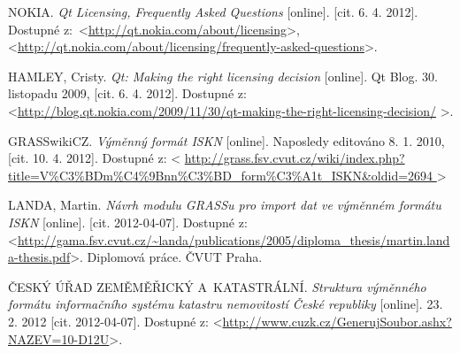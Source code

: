 \documentclass[a4paper,12pt]{article}
\begin{document}
\newpage
\renewcommand{\refname}{Literatura}
{}
\begin{thebibliography}{9}

NOKIA. \textit{Qt Licensing, Frequently Asked Questions} [online]. [cit. 6. 4. 2012].
Dostupné z:~\textless\url{http://qt.nokia.com/about/licensing}\textgreater, \textless\url{http://qt.nokia.com/about/licensing/frequently-asked-questions}\textgreater.

HAMLEY, Cristy. \textit{Qt: Making the right licensing decision} [online]. Qt Blog. 30. listopadu 2009, [cit. 6. 4. 2012]. Dostupné z: \textless\url{http://blog.qt.nokia.com/2009/11/30/qt-making-the-right-licensing-decision/} \textgreater.

GRASSwikiCZ. \textit{Výměnný formát ISKN} [online].
Naposledy editováno 8. 1. 2010, [cit. 10. 4. 2012]. Dostupné z: \textless
\url{
    http://grass.fsv.cvut.cz/wiki/index.php?title=V%
    } \textgreater

LANDA, Martin. \emph{Návrh modulu GRASSu pro import dat ve výměnném formátu ISKN} [online]. [cit. 2012-04-07]. Dostupné z: \textless\url{http://gama.fsv.cvut.cz/~landa/publications/2005/diploma_thesis/martin.landa-thesis.pdf}\textgreater. Diplomová práce. ČVUT Praha.

ČESKÝ ÚŘAD ZEMĚMĚŘICKÝ A~KATASTRÁLNÍ. \emph{Struktura výměnného formátu informačního systému katastru nemovitostí České republiky} [online]. 23. 2. 2012 [cit. 2012-04-07]. Dostupné z: \textless\url{http://www.cuzk.cz/GenerujSoubor.ashx?NAZEV=10-D12U}\textgreater.
    
    \end{thebibliography}
\end{document}
